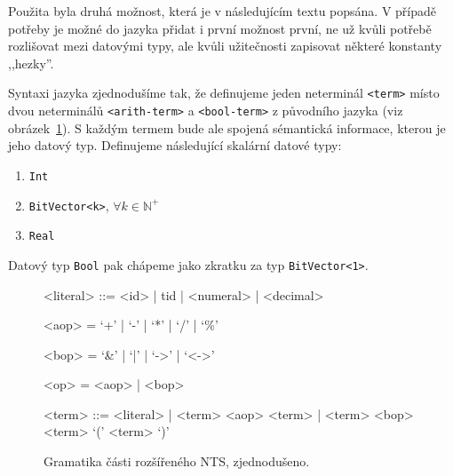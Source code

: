 \documentclass[12pt]{fithesis2}
\begin{document}
Použita byla druhá možnost, která je v následujícím textu popsána. V případě potřeby je možné do jazyka přidat i první možnost první, ne už kvůli potřebě rozlišovat mezi datovými typy, ale kvůli užitečnosti zapisovat některé konstanty ,,hezky''.

Syntaxi jazyka zjednodušíme tak, že definujeme jeden neterminál \texttt{<term>} místo dvou neterminálů \texttt{<arith-term>} a \texttt{<bool-term>} z původního jazyka (viz obrázek~\ref{fig:nts-ext-grammar}). S každým termem bude ale spojená sémantická informace, kterou je jeho datový typ. Definujeme následující skalární datové typy:
\begin{enumerate}
\item \texttt{Int}
\item \texttt{BitVector<k>}, $\forall k \in \mathbb{N^+}$
\item \texttt{Real}
\end{enumerate}
Datový typ \texttt{Bool} pak chápeme jako zkratku za typ \texttt{BitVector<1>}.

\begin{figure}[t]
\begin{grammar}
<literal> ::= <id> | tid | <numeral> | <decimal>

<aop> = `+'  | `-' | `*' | `/' |  `\%'

<bop> = `&' | `|' | `->' | `<->'

<op> = <aop> | <bop>

<term> ::= <literal> | <term> <aop> <term> | <term> <bop> <term> 
\alt `(' <term> `)'
\end{grammar}
\caption{Gramatika části rozšířeného NTS, zjednodušeno.}
\label{fig:nts-ext-grammar}
\end{figure}
\end{document}

